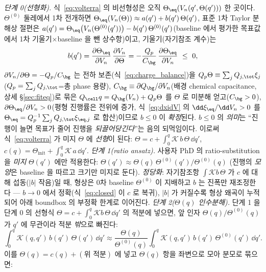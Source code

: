 \emph{단계 0(선형화).} 식~\eqref{eq:volterra} 의 비선형성은 오직 $\Theta_\eq(V_n(q',\Theta(q')))$ 한 곳이다.
$\Theta^{(0)}$ 둘레에서 1차 전개하면 $\Theta_\eq(V_n(\Theta))\approx a(q')+b(q')\,\Theta(q')$, 표준 1차 Taylor
분해상 절편은 $a(q')=\Theta_\eq\big(V_n(\Theta^{(0)}(q'))\big)-b(q')\,\Theta^{(0)}(q')$(baseline 에서 평가한 목표값에서
1차 기울기$\times$baseline 을 뺀 상수항)이고, 기울기(자기참조 계수)는
\begin{equation}
b(q')=\frac{\partial\Theta_\eq}{\partial V_n}\,\frac{\partial V_n}{\partial\Theta}
=-\frac{Q_p}{C_\bg}\,\frac{\partial\Theta_\eq}{\partial V_n}\ \le\ 0,
\label{eq:selfcoupling}
\end{equation}
$\partial V_n/\partial\Theta=-Q_p/C_\bg$ 는 전하 보존(식~\eqref{eq:charge_balance})을 $Q_p\Theta\equiv\sum_j
Q_{j,\tot}\xi_j$($Q_p=\sum_j Q_{j,\tot}$=총 phase 용량), $C_\bg\equiv\partial Q_\bg/\partial V_n$(배경 chemical
capacitance, 상세 \S\ref{sec:fiteq})로 묶은 $Q_\cell q=Q_\bg(V_n)+Q_p\Theta$ 를 $\Theta$ 로 미분해 얻고($C_\bg>0$), $\partial\Theta_\eq/\partial V_n>0$(평형 진행률은 전위에 증가, 식~\eqref{eq:dxidV} 의 $\dd\xi_\eq/\dd V_n>0$
를 $\Theta_\eq=Q_p^{-1}\sum_j Q_{j,\tot}\xi_{\eq,j}$ 로 합산)이므로 $b\le0$ 이 \emph{확정}된다. $b\le0$ 의 \emph{의미}는
``진행이 늘면 목표가 줄어 진행을 \emph{되끌어당긴다}''는 음의 되먹임이다.
이로써 식~\eqref{eq:volterra} 가 미지 $\Theta$ 에 \emph{선형}이 된다: $\Theta=c+\int_0^q\mathcal K\,b\,\Theta\,\dd q'$,
$c(q)=\Theta_\mathrm{init}+\int_0^q\mathcal K\,a\,\dd q'$.
\emph{단계 1(ratio ansatz).} 사용자 PhD \cite{lee2011,son2013} 의 ratio-substitution 을 \emph{미지} $\Theta(q')$
에만 적용한다: $\Theta(q')\approx\Theta(q)\,\Theta^{(0)}(q')/\Theta^{(0)}(q)$ (진행의 \emph{모양}은 baseline 을
따르고 크기만 미지로 둔다). \emph{정당화}: 자기참조항 $\int\mathcal K b\,\Theta$ 가 $c$ 에 대해 섭동($|b|$ 작음)일
때, 형상은 0차 baseline $\Theta^{(0)}$ 이 지배하고 $b$ 는 진폭만 재조정한다 — $b\to0$ 에서 정확(식~\eqref{eq:closed}
이 $c$ 로 복귀), $|b|$ 가 커질수록 형상 왜곡이 누적되어 아래 boundbox 의 부정확 한계로 이어진다.
\emph{단계 2($\Theta(q)$ 인수분해).} 단계 1 을 단계 0 의 선형식 $\Theta=c+\int_0^q\mathcal K b\,\Theta\,\dd q'$ 의
적분에 넣으면, 앞 인자 $\Theta(q)/\Theta^{(0)}(q)$ 가 $q'$ 에 무관이라 적분 \emph{밖}으로 빠진다:
\begin{equation*}
\int_0^q\mathcal K(q,q')\,b(q')\,\Theta(q')\,\dd q'\approx\frac{\Theta(q)}{\Theta^{(0)}(q)}\int_0^q\mathcal K(q,q')\,b(q')\,\Theta^{(0)}(q')\,\dd q'.
\end{equation*}
이를 $\Theta(q)=c(q)+(\text{위 적분})$ 에 넣고 $\Theta(q)$ 항을 좌변으로 모아 분모로 묶으면:
